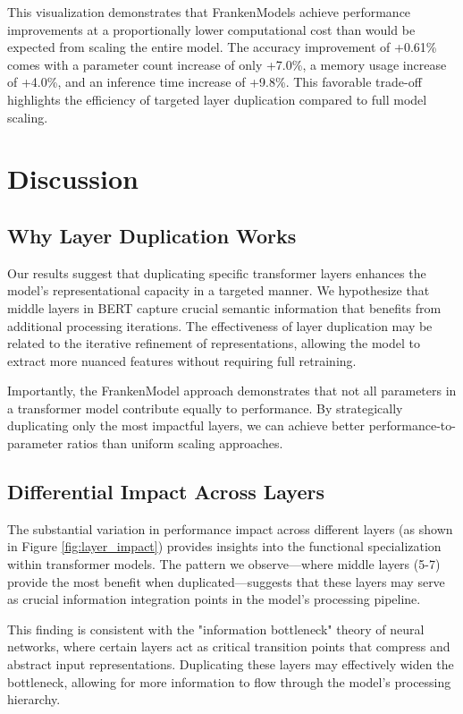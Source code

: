 \documentclass[conference]{IEEEtran}
\begin{document}
This visualization demonstrates that FrankenModels achieve performance improvements at a proportionally lower computational cost than would be expected from scaling the entire model. The accuracy improvement of +0.61\% comes with a parameter count increase of only +7.0\%, a memory usage increase of +4.0\%, and an inference time increase of +9.8\%. This favorable trade-off highlights the efficiency of targeted layer duplication compared to full model scaling.

\section{Discussion}

\subsection{Why Layer Duplication Works}
Our results suggest that duplicating specific transformer layers enhances the model's representational capacity in a targeted manner. We hypothesize that middle layers in BERT capture crucial semantic information that benefits from additional processing iterations. The effectiveness of layer duplication may be related to the iterative refinement of representations, allowing the model to extract more nuanced features without requiring full retraining.

Importantly, the FrankenModel approach demonstrates that not all parameters in a transformer model contribute equally to performance. By strategically duplicating only the most impactful layers, we can achieve better performance-to-parameter ratios than uniform scaling approaches.

\subsection{Differential Impact Across Layers}
The substantial variation in performance impact across different layers (as shown in Figure \ref{fig:layer_impact}) provides insights into the functional specialization within transformer models. The pattern we observe—where middle layers (5-7) provide the most benefit when duplicated—suggests that these layers may serve as crucial information integration points in the model's processing pipeline.

This finding is consistent with the "information bottleneck" theory of neural networks, where certain layers act as critical transition points that compress and abstract input representations. Duplicating these layers may effectively widen the bottleneck, allowing for more information to flow through the model's processing hierarchy.
\end{document}
